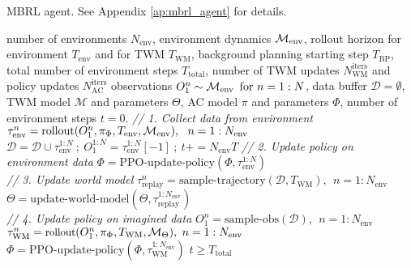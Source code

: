 \begin{algorithm}[!htbp]
\caption{MBRL agent. See Appendix \ref{ap:mbrl_agent} for details.}
\label{algo:MBRL}
\begin{algorithmic}
 number of environments $N_{\text{env}}$,
\newline
environment dynamics $\operatorname*{\mathcal{M}_{\text{env}}}$,
\newline
rollout horizon for environment $T_{\text{env}}$ and for TWM $T_{\text{WM}}$,
\newline
background planning starting step $T_{\text{BP}}$,
\newline
total number of environment steps $T_{\text{total}}$,
\newline
number of TWM updates $N^{\text{iters}}_{\text{WM}}$ and policy updates $N^{\text{iters}}_{\text{AC}}$
\medskip
{} observations $O^n_1 \sim \operatorname*{\mathcal{M}_{\text{env}}} ~\text{for}~ \small{n=1:N}$,
\newline
data buffer $\mathcal{D}=\emptyset$, 
\newline
TWM model $\mathcal{M}$ and parameters $\Theta$, 
\newline
AC model $\pi$ and parameters $\Phi$,
\newline
number of environment steps $t=0$.
\smallskip
\REPEAT
\STATE \textit{// 1. Collect data from environment}
\STATE $\tau^n_{\text{env}} = \text{rollout}
(O_1^n, \pi_{\Phi}, T_{\text{env}}, \operatorname*{\mathcal{M}_{\text{env}}}),~~n=1:N_{\text{env}}$
\STATE $\mathcal{D} = \mathcal{D} \cup \tau^{1:N}_{\text{env}} ~;~ O^{1:N}_1 = \tau^{1:N}_{\text{env}}[-1] ~;~ t += N_{\text{env}}T$
\medskip
\STATE \textit{// 2. Update policy on environment data}
\STATE $\Phi=\text{PPO-update-policy}(\Phi,\tau_{\text{env}}^{1:N})$\\
\medskip
\STATE \textit{// 3. Update world model}
\STATE  $\tau_{\text{replay}} ^{n} =\text{sample-trajectory}(\mathcal{D}, T_{\text{WM}}), ~~n=1:N_{\text{env}}$ \\
\STATE  $\Theta = \text{update-world-model}(\Theta, \tau_{\text{replay}}^{1:N_{\text{env}}})$\\
\ENDFOR
\medskip
\STATE \textit{// 4. Update policy on imagined data}
\STATE $O_1^n = \text{sample-obs}(\mathcal{D}), ~~n=1:N_{\text{env}}$ 
\STATE $\small{\tau_{\text{WM}}^{n}=\text{rollout}
(O_1^n,\pi_{\Phi}, T_{\text{WM}},\mathcal{M}_{\Theta}), ~n=1:N_{\text{env}}}$ 
\STATE $\Phi=\text{PPO-update-policy}(\Phi,\tau_{\text{WM}}^{1:N_{\text{env}}})$
\ENDFOR
\ENDIF
\UNTIL $t \ge T_{\text{total}}$
\end{algorithmic}
\end{algorithm}

